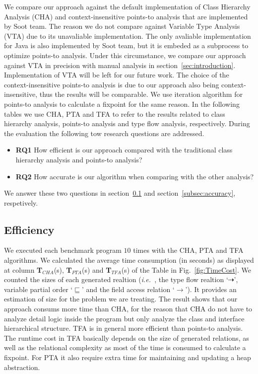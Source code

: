 \documentclass{fac}
\newcommand\ie{\textit{i.e.\ }}
\newcommand{\less}{\sqsubseteq}
\newcommand{\tflow}{\dashrightarrow}
\newcommand{\hflow}{\longrightarrow}
\begin{document}
We compare our approach against the default implementation of Class Hierarchy Analysis (CHA) and context-insensitive points-to analysis that are implemented by Soot team. The reason we do not compare against Variable Type Analysis (VTA) due to its unavaliable implementation. The only avaliable implementation for Java is also implemented by Soot team, but it is embeded as a subprocess to optimize points-to analysis. Under this circumstance, we compare our approach against VTA in precision with manual analysis in section~\ref{sec:introduction}. Implementation of VTA will be left for our future work. The choice of the context-insensitive points-to analysis is due to our approach also being context-insensitive, thus the results will be comparable. We use iteration algorithm for points-to analysis to calculate a fixpoint for the same reason. In the following tables we use CHA, PTA and TFA to refer to the results related to class hierarchy analysis, points-to analysis and type flow analysis, respectively. During the evaluation the following tow research questions are addressed.
\begin{itemize}
\item \textbf{RQ1} How efficient is our approach compared with the traditional class hierarchy analysis and points-to analysis?
\item \textbf{RQ2} How accurate is our algorithm when comparing with the other analysis?
\end{itemize}
We answer these two questions in section~\ref{subsec:efficiency} and section~\ref{subsec:accuracy}, respetively.

\subsection{Efficiency}\label{subsec:efficiency}
We executed each benchmark program $10$ times with the CHA, PTA and TFA algorithms. We calculated the average time consumption (in seconds) as displayed at column \textbf{T$_{CHA}$}(s), \textbf{T$_{PTA}$}(s) and \textbf{T$_{TFA}$}(s) of the Table in Fig.~\ref{fig:TimeCost}. We counted the sizes of each generated realtion (\ie, the type flow realtion `$\tflow$', variable partial order `$\less$' and the field access relation `$\hflow$'). It provides an estimation of size for the problem we are treating. The result shows that our approach consums more time than CHA, for the reason that CHA do not have to analyze detail logic inside the program but only analyze the class and interface hierarchical structure. TFA is in general more efficient than points-to analysis. The runtime cost in TFA basically depends on the size of generated relations, as well as the relational complexity as most of the time is consumed to calculate a fixpoint. For PTA it also require extra time for maintaining and updating a heap abstraction.
\end{document}
